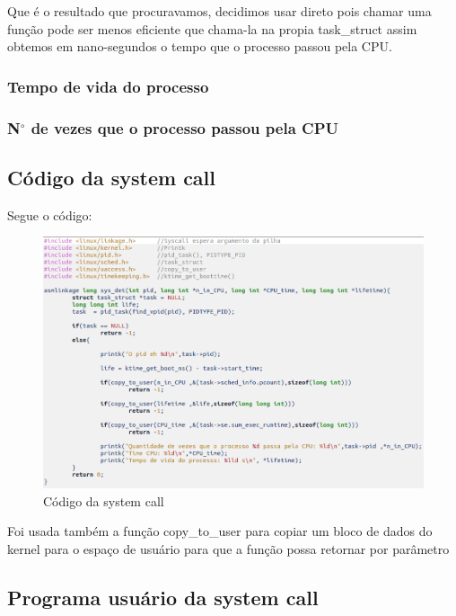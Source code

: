 \documentclass[12pt]{article}
\begin{document}
	Que é o resultado que procuravamos, decidimos usar direto pois chamar uma função pode ser menos eficiente que chama-la na propia task\_struct assim obtemos em nano-segundos o tempo que o processo passou pela CPU.


\subsubsection*{Tempo de vida do processo}
\subsubsection*{N$^{\circ}$  de vezes que o processo passou pela CPU}
\subsection*{Código da system call}
Segue o código:

\vspace*{0.2cm}
\begin{figure}[!h]
	\centering
\includegraphics[scale=0.5]{imagens/codigosys.png} 
	\caption{Código da system call}
\end{figure}
\vspace*{0.2cm}

Foi usada também a função copy\_to\_user para copiar um bloco de dados do kernel para o espaço de usuário para que a função possa retornar por parâmetro

\subsection*{Programa usuário da system call}




\end{document}
